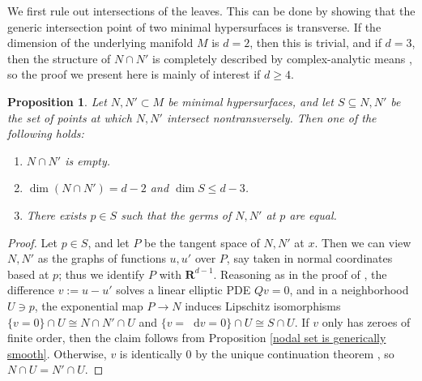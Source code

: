 \documentclass[reqno,11pt]{amsart}
\newcommand{\RR}{\mathbf{R}}
\newcommand*\dif{\mathop{}\!\mathrm{d}}
\newtheorem{proposition}[theorem]{Proposition}
\theoremstyle{definition}
\numberwithin{equation}{section}
\begin{document}
We first rule out intersections of the leaves.
This can be done by showing that the generic intersection point of two minimal hypersurfaces is transverse.
If the dimension of the underlying manifold $M$ is $d = 2$, then this is trivial, and if $d = 3$, then the structure of $N \cap N'$ is completely described by complex-analytic means \cite[Theorem 7.3]{colding2011course}, so the proof we present here is mainly of interest if $d \geq 4$.

\begin{proposition}\label{intersection theory prop}
Let $N, N' \subset M$ be minimal hypersurfaces, and let $S \subseteq N, N'$ be the set of points at which $N, N'$ intersect nontransversely.
Then one of the following holds:
\begin{enumerate}
\item $N \cap N'$ is empty.
\item $\dim(N \cap N') = d - 2$ and $\dim S \leq d - 3$.
\item There exists $p \in S$ such that the germs of $N, N'$ at $p$ are equal.
\end{enumerate}
\end{proposition}
\begin{proof}
Let $p \in S$, and let $P$ be the tangent space of $N, N'$ at $x$.
Then we can view $N, N'$ as the graphs of functions $u, u'$ over $P$, say taken in normal coordinates based at $p$; thus we identify $P$ with $\RR^{d - 1}$.
Reasoning as in the proof of \cite[Theorem 7.3]{colding2011course}, the difference $v := u - u'$ solves a linear elliptic PDE $Qv = 0$, and in a neighborhood $U \ni p$, the exponential map $P \to N$ induces Lipschitz isomorphisms $\{v = 0\} \cap U \cong N \cap N' \cap U$ and $\{v = \dif v = 0\} \cap U \cong S \cap U$.
If $v$ only has zeroes of finite order, then the claim follows from Proposition \ref{nodal set is generically smooth}.
Otherwise, $v$ is identically $0$ by the unique continuation theorem \cite[Theorem 6.1]{colding2011course}, so $N \cap U = N' \cap U$.
\end{proof}
\end{document}
